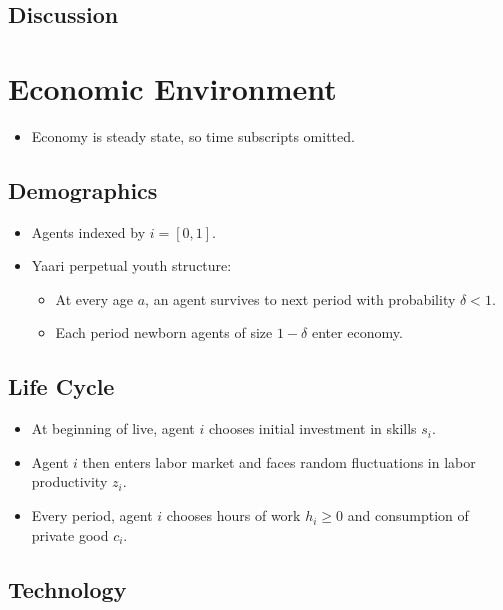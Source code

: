 \documentclass{article}
\begin{document}
\subsection{Discussion}

\section{Economic Environment}



\begin{itemize}
\item Economy is steady state, so time subscripts omitted.
\end{itemize}



\subsection{Demographics}


\begin{itemize}
\item Agents indexed by $i = [0,1]$.
\item Yaari perpetual youth structure: 
\begin{itemize}
\item At every age $a$, an agent survives to next period with probability $\delta < 1$.
\item Each period newborn agents of size $1-\delta$ enter economy.
\end{itemize}
\end{itemize}


\subsection{Life Cycle}


\begin{itemize}
\item At beginning of live, agent $i$ chooses initial investment in skills $s_i$.
\item Agent $i$ then enters labor market and faces random  fluctuations in labor productivity $z_i$.
\item Every period, agent $i$ chooses hours of work $h_i \ge 0$ and consumption of private good $c_i$.
\end{itemize}



\subsection{Technology}
\end{document}
